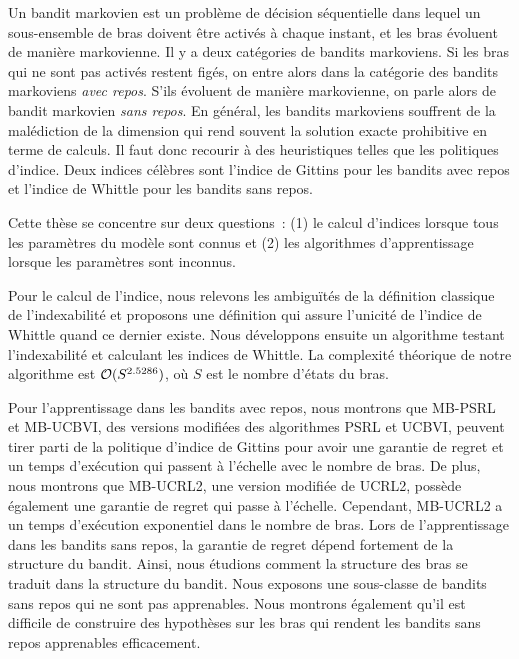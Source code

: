 Un bandit markovien est un problème de décision séquentielle dans lequel un sous-ensemble de bras doivent être activés à chaque instant, et les bras évoluent de manière markovienne.
Il y a deux catégories de bandits markoviens. 
Si les bras qui ne sont pas activés restent figés, on entre alors dans la catégorie des bandits markoviens \emph{avec repos}.
S'ils évoluent de manière markovienne, on parle alors de bandit markovien \emph{sans repos}.
En général, les bandits markoviens souffrent de la malédiction de la dimension qui rend souvent la solution exacte prohibitive en terme de calculs.
Il faut donc recourir à des heuristiques telles que les politiques d'indice.
Deux indices célèbres sont l'indice de Gittins pour les bandits avec repos et l'indice de Whittle pour les bandits sans repos.

Cette thèse se concentre sur deux questions : (1) le calcul d'indices lorsque tous les paramètres du modèle sont connus et (2) les algorithmes d'apprentissage lorsque les paramètres sont inconnus.

Pour le calcul de l'indice, nous relevons les ambiguïtés de la définition classique de l'indexabilité et proposons une définition qui assure l'unicité de l'indice de Whittle quand ce dernier existe.
Nous développons ensuite un algorithme testant l'indexabilité et calculant les indices de Whittle.
La complexité théorique de notre algorithme est $\mathcal{O}(S^{2.5286})$, où $S$ est le nombre d'états du bras.

Pour l'apprentissage dans les bandits avec repos, nous montrons que MB-PSRL et MB-UCBVI, des versions modifiées des algorithmes PSRL et UCBVI, peuvent tirer parti de la politique d'indice de Gittins pour avoir une garantie de regret et un temps d'exécution qui passent à l'échelle avec le nombre de bras.
De plus, nous montrons que MB-UCRL2, une version modifiée de UCRL2, possède également une garantie de regret qui passe à l'échelle.
Cependant, MB-UCRL2 a un temps d'exécution exponentiel dans le nombre de bras.
Lors de l'apprentissage dans les bandits sans repos, la garantie de regret dépend fortement de la structure du bandit. Ainsi, nous étudions comment la structure des bras se traduit dans la structure du bandit.
Nous exposons une sous-classe de bandits sans repos qui ne sont pas apprenables.
Nous montrons également qu'il est difficile de construire des hypothèses sur les bras qui rendent les bandits sans repos apprenables efficacement.

